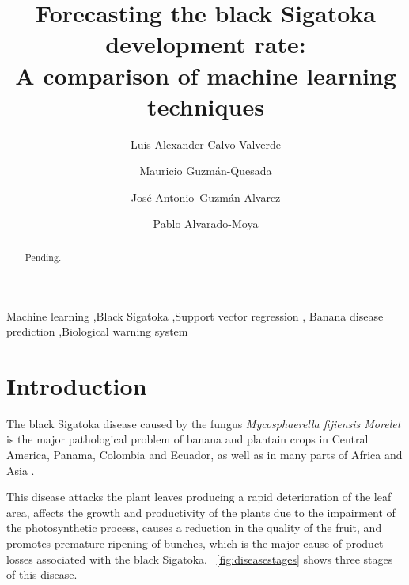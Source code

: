 \documentclass[review,authoryear,english]{elsarticle}
\begin{document}
\begin{frontmatter}

\title{Forecasting the black Sigatoka development rate:\\ 
A comparison of machine learning techniques}

\author[afiLuisAlex]{Luis-Alexander Calvo-Valverde}

\author[afiCorbana]{Mauricio Guzmán-Quesada}
\author[afiCorbana]{José-Antonio~Guzmán-Alvarez}
\author[afiPablo]{Pablo Alvarado-Moya}

\address[afiLuisAlex]{DOCINADE, Instituto Tecnológico de Costa Rica, 
Computer Research Center, Multidisciplinar program eScience, Cartago, Costa Rica}

\address[afiCorbana]{Dirección de Investigaciones, Corporación Bananera Nacional S.A., Guápiles, Costa Rica}

\address[afiPablo]{DOCINADE, Instituto Tecnológico de Costa Rica, Cartago, Costa Rica}

\begin{abstract}
Pending.
\end{abstract}

\begin{keyword}
Machine learning \sep Black Sigatoka \sep Support vector regression \sep
Banana disease prediction \sep Biological warning system 
\end{keyword}

\end{frontmatter}

\linenumbers

\section{Introduction}

The black Sigatoka disease caused by the fungus \emph{Mycosphaerella
  fijiensis Morelet} is the major pathological problem of banana and
plantain crops in Central America, Panama, Colombia and Ecuador, as well as in
many parts of Africa and Asia \citep{MarinVargas1995}.

This disease attacks the plant leaves producing a rapid deterioration
of the leaf area, affects the growth and productivity of the plants
due to the impairment of the photosynthetic process, causes a
reduction in the quality of the fruit, and promotes premature
ripening of bunches, which is
the major cause of product losses associated with the black
Sigatoka. \figurename~\ref{fig:diseasestages} shows three stages of
this disease.
	 
\end{document}
